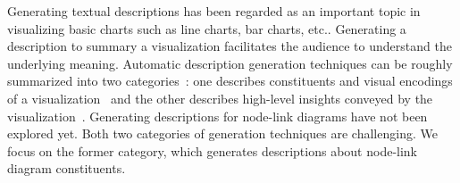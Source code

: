 Generating textual descriptions has been regarded as an important topic in visualizing basic charts such as line charts, bar charts, etc..
Generating a description to summary a visualization facilitates the audience to understand the underlying meaning.
Automatic description generation techniques can be roughly summarized into two categories~\cite{DBLP:conf/inlg/ObeidH20}: one describes constituents and visual encodings of a visualization~\cite{DBLP:journals/coling/MittalMCR98, DBLP:journals/tochi/FerresLST13} and the other describes high-level insights conveyed by the visualization~\cite{DBLP:conf/apvis/LiuXHWY20, DBLP:conf/inlg/ObeidH20}.
Generating descriptions for node-link diagrams have not been explored yet.
Both two categories of generation techniques are challenging.
We focus on the former category, which generates descriptions about node-link diagram constituents.


